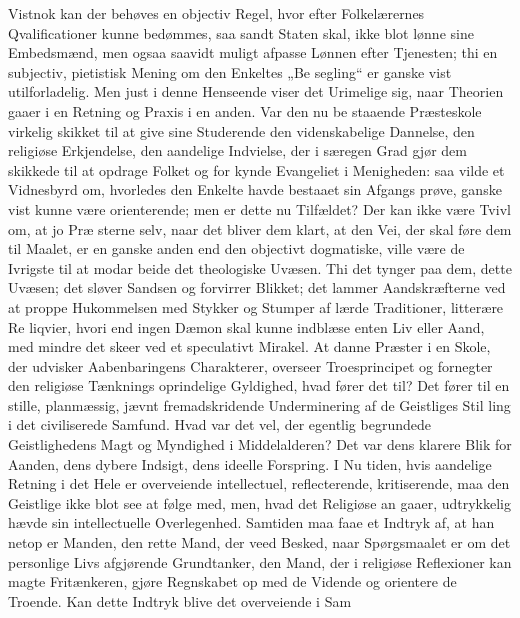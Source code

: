 \documentclass[12pt]{book}
\newcommand{\opage}[1]{\marginnote{\footnotesize\textit{[#1]}}}
\begin{document}
Vistnok kan der behøves en objectiv Regel, hvor\-%
efter Folkelærernes Qvalificationer kunne bedømmes, saa
sandt Staten skal, ikke blot lønne sine Embedsmænd,
men ogsaa saavidt muligt afpasse Lønnen efter Tjenesten;
thi en subjectiv, pietistisk Mening om den Enkeltes „Be\-%
segling“ er ganske vist utilforladelig. Men just i denne
\opage{291}\setcounter{footnote}{0}%
Henseende viser det Urimelige sig, naar Theorien gaaer
i en Retning og Praxis i en anden. Var den nu be\-%
staaende Præsteskole virkelig skikket til at give sine
Studerende den videnskabelige Dannelse, den religiøse
Erkjendelse, den aandelige Indvielse, der i særegen
Grad gjør dem skikkede til at opdrage Folket og for\-%
kynde Evangeliet i Menigheden: saa vilde et Vidnesbyrd
om, hvorledes den Enkelte havde bestaaet sin Afgangs\-%
prøve, ganske vist kunne være orienterende; men er dette
nu Tilfældet? Der kan ikke være Tvivl om, at jo Præ\-%
sterne selv, naar det bliver dem klart, at den Vei, der
skal føre dem til Maalet, er en ganske anden end den
objectivt dogmatiske, ville være de Ivrigste til at modar\-%
beide det theologiske Uvæsen. Thi det tynger paa dem,
dette Uvæsen; det sløver Sandsen og forvirrer Blikket;
det lammer Aandskræfterne ved at proppe Hukommelsen
med Stykker og Stumper af lærde Traditioner, litterære Re\-%
liqvier, hvori end ingen Dæmon skal kunne indblæse enten
Liv eller Aand, med mindre det skeer ved et speculativt
Mirakel. At danne Præster i en Skole, der udvisker
Aabenbaringens Charakterer, overseer Troesprincipet og
fornegter den religiøse Tænknings oprindelige Gyldighed,
hvad fører det til? Det fører til en stille, planmæssig,
jævnt fremadskridende Underminering af de Geistliges Stil\-%
ling i det civiliserede Samfund. Hvad var det vel, der
egentlig begrundede Geistlighedens Magt og Myndighed
i Middelalderen? Det var dens klarere Blik for Aanden,
dens dybere Indsigt, dens ideelle Forspring. I Nu\-%
tiden, hvis aandelige Retning i det Hele er overveiende
intellectuel, reflecterende, kritiserende, maa den Geistlige
ikke blot see at følge med, men, hvad det Religiøse an\-%
gaaer, udtrykkelig hævde sin intellectuelle Overlegenhed.
Samtiden maa faae et Indtryk af, at han netop er Manden,
den rette Mand, der veed Besked, naar Spørgsmaalet er
\opage{292}\setcounter{footnote}{0}%
om det personlige Livs afgjørende Grundtanker, den
Mand, der i religiøse Reflexioner kan magte Fritænkeren,
gjøre Regnskabet op med de Vidende og orientere de
Troende. Kan dette Indtryk blive det overveiende i Sam\-%
\end{document}
